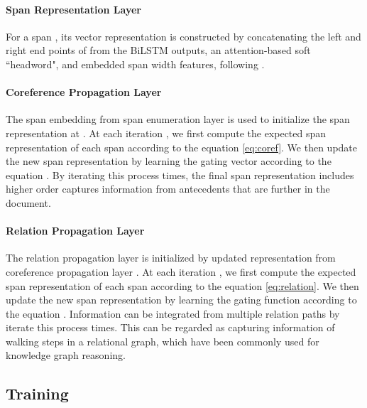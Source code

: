 \paragraph{Span Representation Layer}
For a span , its vector representation  is constructed by concatenating the left and right end points of  from the BiLSTM outputs, an attention-based soft ``headword", and embedded span width
features, following \cite{Lee2017EndtoendNC}.


\paragraph{Coreference Propagation Layer}
The span embedding from span enumeration layer is used to initialize the span representation at . 
At each iteration , we first compute the expected span representation  of each span   according to the equation \ref{eq:coref}. We then update the new span representation  by learning the gating vector  according to the equation .  By iterating this process  times, the final span representation  includes higher order captures information from antecedents that are further in the document.  

\paragraph{Relation Propagation Layer}
The relation propagation layer is initialized by updated representation from  coreference propagation layer .  At each iteration , we first compute the expected span representation  of each span   according to the equation \ref{eq:relation}. We then update the new span representation  by learning the gating function  according to the equation . Information can be integrated from multiple relation paths by iterate this process  times. This can be regarded as capturing information of walking  steps in a relational graph, which have been commonly used for knowledge graph reasoning.   





\subsection{Training}
